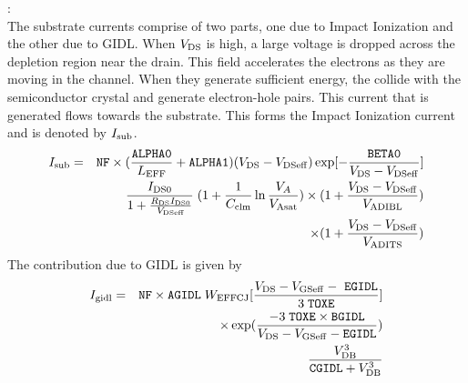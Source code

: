 \documentclass{article}
\begin{document}
:\\
The substrate currents comprise of two parts, one due to Impact
Ionization and the other due to GIDL. When $V_{\rm{DS}}$ is high,
a large voltage is dropped across the depletion region near the
drain. This field accelerates the electrons as they are moving in
the channel. When they generate sufficient energy, the collide
with the semiconductor crystal and generate electron-hole pairs.
This current that is generated flows towards the substrate. This
forms the Impact Ionization current and is denoted by
$I_{\rm{sub}}$.
\begin{eqnarray}
I_{\rm{sub}} & = & \texttt{NF} \times ({\texttt{ALPHA0} \over
L_{\rm{EFF}}} + \texttt{ALPHA1})
(V_{\rm{DS}} - V_{\rm{DSeff}}) \exp[-{\texttt{BETA0} \over V_{\rm{DS}} - V_{\rm{DSeff}}}] \nonumber \\
         & & {I_{\rm{DS0}} \over  1 + {R_{\rm{DS}} I_{\rm{DS0}} \over V_{\rm{DSeff}}}} \; (1 + {1 \over
C_{\rm{clm}}} \ln{V_A \over V_{\rm{Asat}}}) \times (1 +
{V_{\rm{DS}} - V_{\rm{DSeff}} \over V_{\rm{ADIBL}}}) \nonumber \\
         & & \times (1 + {V_{\rm{DS}} - V_{\rm{DSeff}} \over V_{\rm{ADITS}}})
\end{eqnarray}
The contribution due to GIDL is given by
\begin{eqnarray}
I_{\rm{gidl}}& = & \texttt{NF} \times \texttt{AGIDL}\;
W_{\rm{EFFCJ}} [{V_{\rm{DS}} - V_{\rm{GSeff}} -\
               \texttt{EGIDL} \over 3\;\texttt{TOXE}}] \nonumber \\
  & & \times \exp({-3\;\texttt{TOXE} \times \texttt{BGIDL} \over V_{\rm{DS}} - V_{\rm{GSeff}} -
  \texttt{EGIDL}}) \nonumber \\
  & & {V^3_{\rm{DB}} \over \texttt{CGIDL} + V^3_{\rm{DB}}} \nonumber \\
\end{eqnarray}
\end{document}

